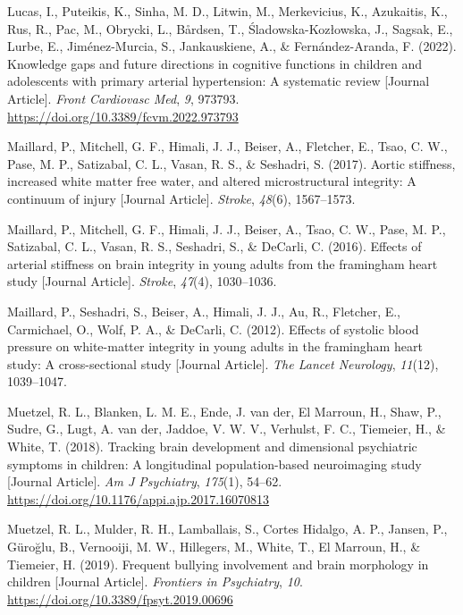 \documentclass[
  letterpaper,
  DIV=11,
  numbers=noendperiod]{scrreport}
\newlength{\cslhangindent}
\newenvironment{CSLReferences}[2] %
 {\begin{list}{}{%
  \setlength{\itemindent}{0pt}
  \setlength{\leftmargin}{0pt}
  \setlength{\parsep}{0pt}
  \ifodd #1
   \setlength{\leftmargin}{\cslhangindent}
   \setlength{\itemindent}{-1\cslhangindent}
  \fi
  \setlength{\itemsep}{#2\baselineskip}}}
 {\end{list}}
\begin{document}
\begin{CSLReferences}{1}{0}
Lucas, I., Puteikis, K., Sinha, M. D., Litwin, M., Merkevicius, K.,
Azukaitis, K., Rus, R., Pac, M., Obrycki, L., Bårdsen, T.,
Śladowska-Kozłowska, J., Sagsak, E., Lurbe, E., Jiménez-Murcia, S.,
Jankauskiene, A., \& Fernández-Aranda, F. (2022). Knowledge gaps and
future directions in cognitive functions in children and adolescents
with primary arterial hypertension: A systematic review {[}Journal
Article{]}. \emph{Front Cardiovasc Med}, \emph{9}, 973793.
\url{https://doi.org/10.3389/fcvm.2022.973793}

Maillard, P., Mitchell, G. F., Himali, J. J., Beiser, A., Fletcher, E.,
Tsao, C. W., Pase, M. P., Satizabal, C. L., Vasan, R. S., \& Seshadri,
S. (2017). Aortic stiffness, increased white matter free water, and
altered microstructural integrity: A continuum of injury {[}Journal
Article{]}. \emph{Stroke}, \emph{48}(6), 1567--1573.

Maillard, P., Mitchell, G. F., Himali, J. J., Beiser, A., Tsao, C. W.,
Pase, M. P., Satizabal, C. L., Vasan, R. S., Seshadri, S., \& DeCarli,
C. (2016). Effects of arterial stiffness on brain integrity in young
adults from the framingham heart study {[}Journal Article{]}.
\emph{Stroke}, \emph{47}(4), 1030--1036.

Maillard, P., Seshadri, S., Beiser, A., Himali, J. J., Au, R., Fletcher,
E., Carmichael, O., Wolf, P. A., \& DeCarli, C. (2012). Effects of
systolic blood pressure on white-matter integrity in young adults in the
framingham heart study: A cross-sectional study {[}Journal Article{]}.
\emph{The Lancet Neurology}, \emph{11}(12), 1039--1047.

Muetzel, R. L., Blanken, L. M. E., Ende, J. van der, El Marroun, H.,
Shaw, P., Sudre, G., Lugt, A. van der, Jaddoe, V. W. V., Verhulst, F.
C., Tiemeier, H., \& White, T. (2018). Tracking brain development and
dimensional psychiatric symptoms in children: A longitudinal
population-based neuroimaging study {[}Journal Article{]}. \emph{Am J
Psychiatry}, \emph{175}(1), 54--62.
\url{https://doi.org/10.1176/appi.ajp.2017.16070813}

Muetzel, R. L., Mulder, R. H., Lamballais, S., Cortes Hidalgo, A. P.,
Jansen, P., Güroğlu, B., Vernooiji, M. W., Hillegers, M., White, T., El
Marroun, H., \& Tiemeier, H. (2019). Frequent bullying involvement and
brain morphology in children {[}Journal Article{]}. \emph{Frontiers in
Psychiatry}, \emph{10}. \url{https://doi.org/10.3389/fpsyt.2019.00696}


\end{CSLReferences}
\end{document}

